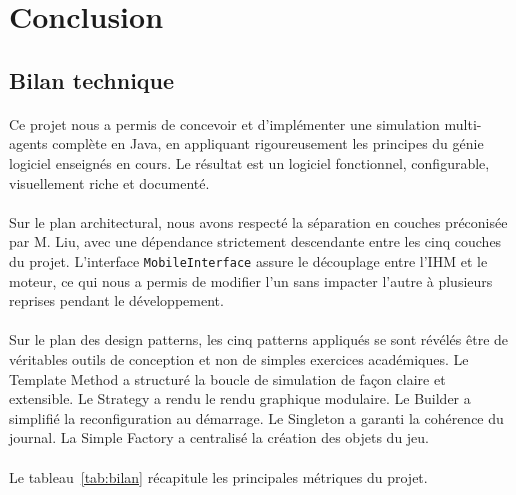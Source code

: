 \section{Conclusion}
\label{sec:conclu}

\subsection{Bilan technique}

\paragraph{} Ce projet nous a permis de concevoir et d'implémenter une simulation multi-agents complète en Java, en appliquant rigoureusement les principes du génie logiciel enseignés en cours. Le résultat est un logiciel fonctionnel, configurable, visuellement riche et documenté.

\paragraph{} Sur le plan architectural, nous avons respecté la séparation en couches préconisée par M. Liu, avec une dépendance strictement descendante entre les cinq couches du projet. L'interface \texttt{MobileInterface} assure le découplage entre l'IHM et le moteur, ce qui nous a permis de modifier l'un sans impacter l'autre à plusieurs reprises pendant le développement.

\paragraph{} Sur le plan des design patterns, les cinq patterns appliqués se sont révélés être de véritables outils de conception et non de simples exercices académiques. Le Template Method a structuré la boucle de simulation de façon claire et extensible. Le Strategy a rendu le rendu graphique modulaire. Le Builder a simplifié la reconfiguration au démarrage. Le Singleton a garanti la cohérence du journal. La Simple Factory a centralisé la création des objets du jeu.

\paragraph{} Le tableau~\ref{tab:bilan} récapitule les principales métriques du projet.

